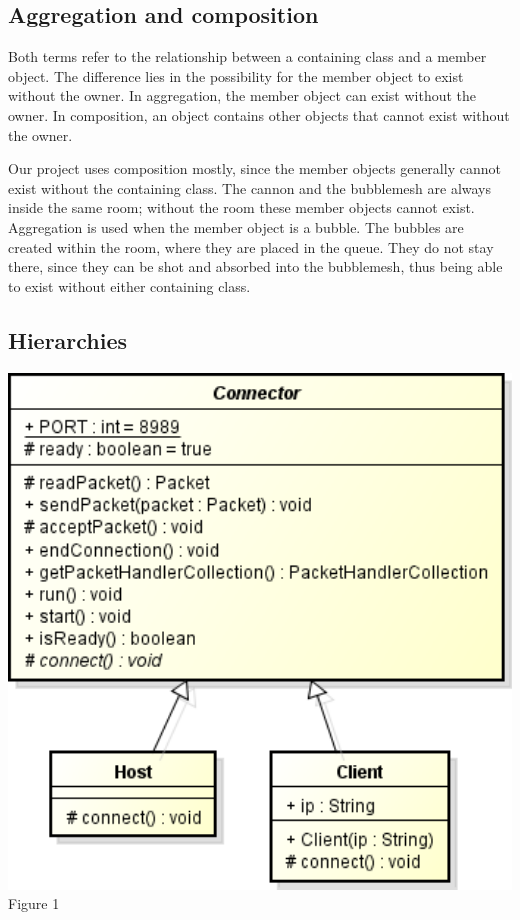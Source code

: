 \documentclass[a4paper]{article}
\begin{document}
\subsection{Aggregation and composition}
Both terms refer to the relationship between a containing class and a member object. The difference lies in the possibility for the member object to exist without the owner. In aggregation, the member object can exist without the owner. In  composition, an object contains other objects that cannot exist without the owner.

Our project uses composition mostly, since the member objects generally cannot exist without the containing class. The cannon and the bubblemesh are always inside the same room; without the room these member objects cannot exist. Aggregation is used when the member object is a bubble. The bubbles are created within the room, where they are placed in the queue. They do not stay there, since they can be shot and absorbed into the bubblemesh, thus being able to exist without either containing class.

\subsection{Hierarchies}
\includegraphics[width=1\textwidth]{Connector_Inher.png}
Figure 1
\end{document}
